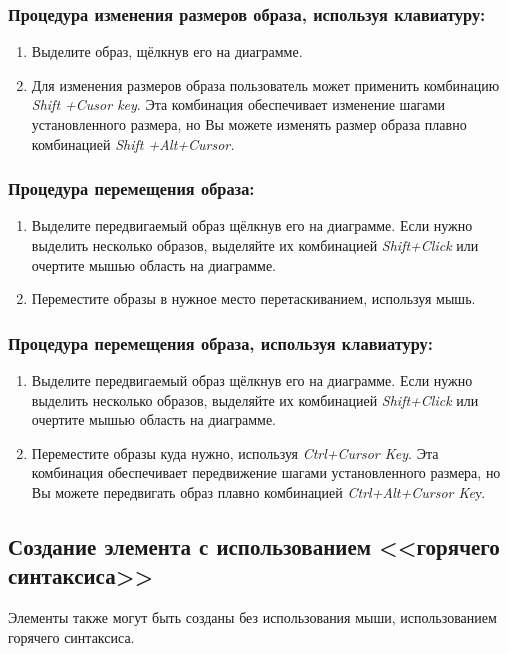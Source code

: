\documentclass[a4paper,12pt]{extreport}
\begin{document}
\subsubsection*{Процедура изменения размеров образа, используя клавиатуру:}
\begin{enumerate}
	\item Выделите образ, щёлкнув его на диаграмме.
	\item Для изменения размеров образа пользователь может применить комбинацию \textit{Shift +Cusor
	key}. Эта комбинация обеспечивает изменение шагами установленного размера, но Вы
	можете изменять размер образа плавно комбинацией \textit{Shift +Alt+Cursor.}
\end{enumerate}

\subsubsection*{Процедура перемещения образа:}
\begin{enumerate}
	\item Выделите передвигаемый образ щёлкнув его на диаграмме. Если нужно выделить несколько
	образов, выделяйте их комбинацией \textit{Shift+Click} или очертите мышью область на диаграмме.
	\item Переместите образы в нужное место перетаскиванием, используя мышь.
\end{enumerate}



\subsubsection*{Процедура перемещения образа, используя клавиатуру:}
\begin{enumerate}
	\item Выделите передвигаемый образ щёлкнув его на диаграмме. Если нужно выделить несколько
	образов, выделяйте их комбинацией \textit{Shift+Click} или очертите мышью область на диаграмме.
	\item Переместите образы куда нужно, используя \textit{Ctrl+Cursor Key}. Эта комбинация обеспечивает
	передвижение шагами установленного размера, но Вы можете передвигать образ плавно
	комбинацией \textit{Ctrl+Alt+Cursor Ke}y.
\end{enumerate}


\subsection*{Создание элемента с использованием <<горячего синтаксиса>>}
Элементы также могут быть созданы без использования мыши, использованием горячего
синтаксиса.
\end{document}
